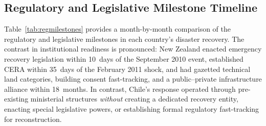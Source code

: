 \documentclass[12pt]{article}
\begin{document}
\subsection{Regulatory and Legislative Milestone Timeline}

Table~\ref{tab:regmilestones} provides a month-by-month comparison of the regulatory and legislative milestones in each country's disaster recovery. The contrast in institutional readiness is pronounced: New Zealand enacted emergency recovery legislation within 10~days of the September 2010 event, established CERA within 35~days of the February 2011 shock, and had gazetted technical land categories, building consent fast-tracking, and a public--private infrastructure alliance within 18~months. In contrast, Chile's response operated through pre-existing ministerial structures \textit{without} creating a dedicated recovery entity, enacting special legislative powers, or establishing formal regulatory fast-tracking for reconstruction.
\end{document}
